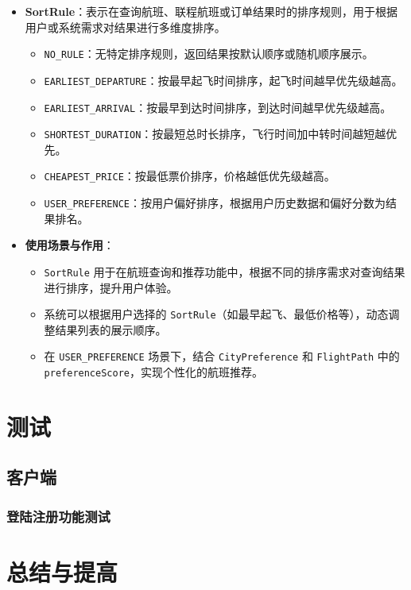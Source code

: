 \documentclass[UTF8, a4paper,12pt]{ctexart}
\begin{document}
\begin{itemize}
    \item \textbf{SortRule}：表示在查询航班、联程航班或订单结果时的排序规则，用于根据用户或系统需求对结果进行多维度排序。
    \begin{itemize}
        \item \texttt{NO\_RULE}：无特定排序规则，返回结果按默认顺序或随机顺序展示。
        \item \texttt{EARLIEST\_DEPARTURE}：按最早起飞时间排序，起飞时间越早优先级越高。
        \item \texttt{EARLIEST\_ARRIVAL}：按最早到达时间排序，到达时间越早优先级越高。
        \item \texttt{SHORTEST\_DURATION}：按最短总时长排序，飞行时间加中转时间越短越优先。
        \item \texttt{CHEAPEST\_PRICE}：按最低票价排序，价格越低优先级越高。
        \item \texttt{USER\_PREFERENCE}：按用户偏好排序，根据用户历史数据和偏好分数为结果排名。
    \end{itemize}
    \item \textbf{使用场景与作用}：
    \begin{itemize}
        \item \texttt{SortRule} 用于在航班查询和推荐功能中，根据不同的排序需求对查询结果进行排序，提升用户体验。
        \item 系统可以根据用户选择的 \texttt{SortRule}（如最早起飞、最低价格等），动态调整结果列表的展示顺序。
        \item 在 \texttt{USER\_PREFERENCE} 场景下，结合 \texttt{CityPreference} 和 \texttt{FlightPath} 中的 \texttt{preferenceScore}，实现个性化的航班推荐。
    \end{itemize}
\end{itemize}

\newpage

\section{测试}
\subsection{客户端}
\subsubsection{登陆注册功能测试}


\newpage


\section{总结与提高}
\end{document}

